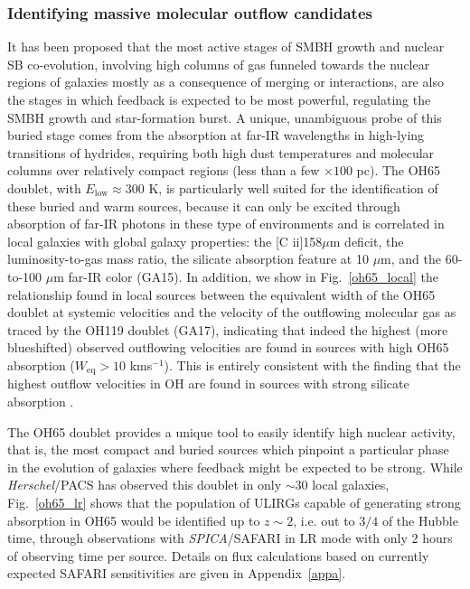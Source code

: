 \documentclass{pasa}%
\newcommand{\kms}{{\hbox {km\thinspace s$^{-1}$}}}
\begin{document}
\subsubsection{Identifying massive molecular outflow candidates}
\label{sec:buried}

It has been proposed that the most active stages of SMBH growth and nuclear SB
co-evolution, involving high columns of 
gas funneled towards the nuclear regions of galaxies mostly as a consequence
of merging or interactions, are also the stages in which feedback is
expected to be most powerful, regulating the SMBH growth and star-formation
burst. A unique, unambiguous probe of this buried stage comes from the
absorption at far-IR wavelengths in high-lying transitions of hydrides,
requiring both high dust temperatures and molecular columns over relatively
compact regions (less than a few $\times100$ pc). The OH65 doublet, with 
$E_{\mathrm{low}}\approx300$ K, is particularly well suited for the
identification of these 
buried and warm sources, because it can only be excited through absorption of
far-IR photons in these type of environments and is correlated in local
galaxies with global galaxy properties: the [C {\sc ii}]158$\mu$m deficit, the
luminosity-to-gas mass ratio, the silicate absorption feature at 10 $\mu$m,
and the 60-to-100 $\mu$m far-IR color (GA15). In addition, we show in
Fig.~\ref{oh65_local} the relationship found in local sources between the
equivalent width of the OH65 doublet at systemic velocities and the velocity
of the outflowing molecular gas as traced by the OH119 doublet (GA17),
indicating that indeed the highest (more blueshifted) observed outflowing
velocities are found in sources with high OH65 absorption
($W_{\mathrm{eq}}>10$ \kms). This is entirely consistent with the finding that
the highest outflow velocities in OH are found in sources with strong silicate
absorption \citep[the upper branch of the fork diagram in][]{spo07,spo13}.

The OH65 doublet provides a unique tool to easily identify high nuclear
activity, that is, the most compact and buried sources which pinpoint a
  particular phase in the evolution of galaxies where feedback might be
  expected to be strong. 
While {\it Herschel}/PACS has observed this doublet in only $\sim30$ local
galaxies, Fig.~\ref{oh65_lr} shows that the population of ULIRGs capable
  of generating strong absorption in OH65 would be identified up to 
$z\sim2$, i.e. out to $3/4$ of the Hubble time, through observations
  with {\it SPICA}/SAFARI in LR mode with only 2 hours of observing time per
  source. Details on flux calculations based on currently expected
SAFARI sensitivities are given in Appendix~\ref{appa}.  
\end{document}
